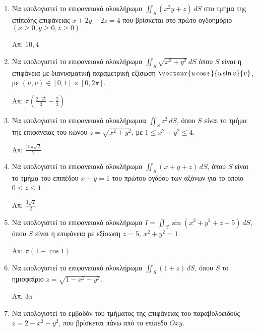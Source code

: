 \documentclass[a4paper,table]{report}
\begin{document}
\thispagestyle{empty}

\begin{center}
\end{center}

\vspace{\baselineskip}

\begin{enumerate}

\item Να υπολογιστεί το επιφανειακό ολοκλήρωμα $\iint_{S}(x^{2}y+z)\,dS$ στο τμήμα της επίπεδης επιφάνειας $x+2y+2z=4$ που βρίσκεται στο πρώτο ογδοημόριο $(x\geq 0, y\geq 0, z\geq 0)$

\hfill Απ: $10,4$

\item Να υπολογιστεί το επιφανειακό ολοκλήρωμα $\iint_{S}\sqrt{x^{2}+y^{2}}\,dS$ όπου $S$ είναι η επιφάνεια με διανυσματική παραμετρική εξίσωση $\vectsur{u\cos v}{u\sin v}{v}$, με $(u,v)\in [0,1]\times[0,2\pi]$.

\hfill Απ: $\pi\left(\frac{2\cdot 2^{\frac{3}{2}}}{3}-\frac{2}{3}\right)$

\item Να υπολογιστεί το επιφανειακό ολοκλήρωμαα $\iint_{S}z^{2}\,dS$, όπου $S$ είναι το τμήμα της επιφάνειας του κώνου $z=\sqrt{x^{2}+y^{2}}$, με $1\leq x^{2}+y^{2}\leq 4$.

\hfill Απ: $\frac{15\pi\sqrt{2}}{2}$

\item Να υπολογιστεί το επιφανειακό ολοκλήρωμα $\iint_{S}(x+y+z)\,dS$, όπου $S$ είναι το τμήμα του επιπέδου $x+y=1$ του πρώτου ογδόου των αξόνων για το οποίο $0\leq z\leq 1$.

\hfill Απ: $\frac{3\sqrt{2}}{2}$

\item Να υπολογιστεί το επιφανειακό ολοκλήρωμα $I=\iint_{S}\sin(x^{2}+y^{2}+z-5)\,dS$, όπου $S$ είναι η επιφάνεια με εξίσωση $z=5$, $x^{2}+y^{2}=1$.

\hfill Απ: $\pi(1-\cos 1)$

\item Να υπολογιστεί το επιφανειακό ολοκλήρωμα $\iint_{S}(1+z)\,dS$, όπου $S$  το ημισφαίριο $z=\sqrt{1-x^{2}-y^{2}}$.

\hfill Απ: $3\pi$

\item Να υπολογιστεί το εμβαδόν του τμήματος της επιφάνειας του παραβολοειδούς $z=2-x^{2}-y^{2}$, που βρίσκεται πάνω από το επίπεδο $Oxy$.


\end{enumerate}
\end{document}

